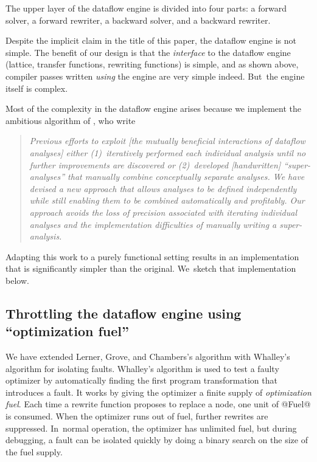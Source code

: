 \documentclass[blockstyle,preprint,nocopyrightspace]{sigplanconf}
\newcommand\seclabel[1]{\label{sec:#1}}
\begin{document}
The upper layer of the dataflow engine is divided into four parts:
a forward solver, a forward rewriter,
a backward solver, and a backward rewriter.

Despite the implicit claim in the title of this paper,
the dataflow engine is not simple.
The benefit of our design is that the \emph{interface} to the dataflow
engine (lattice, transfer functions, rewriting functions) is simple,
and as shown above, compiler passes written \emph{using} the engine
are very simple indeed.
But~the engine itself is complex.

Most of the complexity in the dataflow engine arises because we
implement the ambitious algorithm of
\citet{lerner-grove-chambers:2002}, who write
\begin{quote}
\emph{Previous efforts to exploit [the mutually beneficial
interactions of dataflow analyses] either (1)~iteratively performed
each individual analysis until no further improvements are discovered
or (2)~developed [handwritten] ``super-analyses'' that manually
combine conceptually separate analyses. We have devised a new approach
that allows analyses to be defined independently while still enabling
them to be combined automatically and profitably. Our approach avoids
the loss of precision associated with iterating individual analyses
and the implementation difficulties of manually writing a
super-analysis.}
\end{quote}
Adapting this work to a purely functional setting results in an
implementation that is significantly simpler than the original.
We~sketch that implementation below.



\subsection{Throttling the dataflow engine using ``optimization
  fuel''}

\seclabel{vpoiso}

We have extended Lerner, Grove, and Chambers's algorithm with
Whalley's \citeyearpar{whalley:isolation} algorithm for isolating
faults.
Whalley's algorithm is used to test a faulty optimizer by automatically
finding the first program transformation that introduces a fault.
It works by giving the optimizer a finite supply of \emph{optimization
fuel}.
Each time a rewrite function proposes to replace a node, one unit of @Fuel@ is
consumed.
When the optimizer runs out of fuel, further rewrites are suppressed.
In~normal operation, the optimizer has unlimited fuel, but during
debugging, a fault can be isolated quickly by doing a binary search on
the size of the fuel supply.
\end{document}
